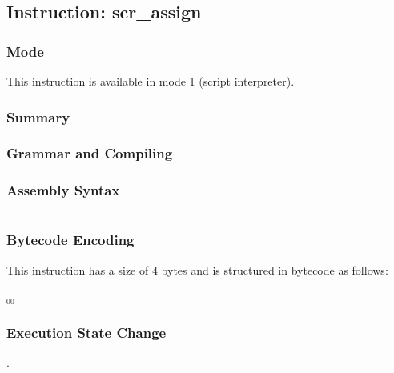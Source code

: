 \subsection{Instruction: scr\_assign}

\subsubsection{Mode}
This instruction is available in mode 1 (script interpreter).
\subsubsection{Summary}


\subsubsection{Grammar and Compiling}


\subsubsection{Assembly Syntax}

\begin{myquote}
\begin{verbatim}

\end{verbatim}
\end{myquote}

\subsubsection{Bytecode Encoding}

This instruction has a size of 4 bytes and is structured in bytecode as follows:

$_{00}$\ 

\subsubsection{Execution State Change}

.


